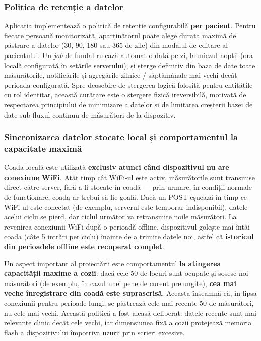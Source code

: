 \documentclass[12pt,a4paper,twoside]{article}
\begin{document}
\subsubsection{Politica de retenție a datelor}

Aplicația implementează o politică de retenție configurabilă \textbf{per pacient}. Pentru fiecare persoană monitorizată, aparținătorul poate alege durata maximă de păstrare a datelor (30, 90, 180 sau 365 de zile) din modalul de editare al pacientului. Un \textit{job} de fundal rulează automat o dată pe zi, la miezul nopții (ora locală configurată în setările serverului), și șterge definitiv din baza de date toate măsurătorile, notificările și agregările zilnice / săptămânale mai vechi decât perioada configurată. Spre deosebire de ștergerea logică folosită pentru entitățile cu rol identitar, această curățare este o ștergere fizică ireversibilă, motivată de respectarea principiului de minimizare a datelor și de limitarea creșterii bazei de date sub fluxul continuu de măsurători de la dispozitiv.

\subsubsection{Sincronizarea datelor stocate local și comportamentul la capacitate maximă}

Coada locală este utilizată \textbf{exclusiv atunci când dispozitivul nu are conexiune WiFi}. Atât timp cât WiFi-ul este activ, măsurătorile sunt transmise direct către server, fără a fi stocate în coadă — prin urmare, în condiții normale de funcționare, coada ar trebui să fie goală. Dacă un POST eșuează în timp ce WiFi-ul este conectat (de exemplu, serverul este temporar indisponibil), datele acelui ciclu se pierd, dar ciclul următor va retransmite noile măsurători. La revenirea conexiunii WiFi după o perioadă offline, dispozitivul golește mai întâi coada (câte 5 intrări per ciclu) înainte de a trimite datele noi, astfel că \textbf{istoricul din perioadele offline este recuperat complet}.

Un aspect important al proiectării este comportamentul \textbf{la atingerea capacității maxime a cozii}: dacă cele 50 de locuri sunt ocupate și sosesc noi măsurători (de exemplu, în cazul unei pene de curent prelungite), \textbf{cea mai veche înregistrare din coadă este suprascrisă}. Aceasta înseamnă că, în lipsa conexiunii pentru perioade lungi, se păstrează cele mai recente 50 de măsurători, nu cele mai vechi. Această politică a fost aleasă deliberat: datele recente sunt mai relevante clinic decât cele vechi, iar dimensiunea fixă a cozii protejează memoria flash a dispozitivului împotriva uzurii prin scrieri excesive.
\end{document}
